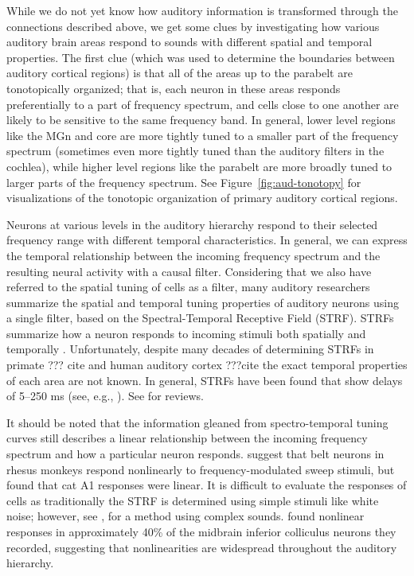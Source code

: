While we do not yet know how auditory information
is transformed through the connections
described above,
we get some clues by investigating
how various auditory brain areas
respond to sounds with different
spatial and temporal properties.
The first clue
(which was used to determine the boundaries
between auditory cortical regions)
is that all of the areas
up to the parabelt are
tonotopically organized;
that is, each neuron in these areas
responds preferentially to
a part of frequency spectrum,
and cells close to one another
are likely to be sensitive
to the same frequency band.
In general, lower level regions
like the MGn and core
are more tightly tuned
to a smaller part of the frequency spectrum
(sometimes even more tightly tuned
than the auditory filters in the cochlea),
while higher level regions
like the parabelt
are more broadly tuned
to larger parts of the frequency spectrum.
See Figure~\ref{fig:aud-tonotopy} for visualizations
of the tonotopic organization
of primary auditory cortical regions.


Neurons at various levels in the auditory hierarchy
respond to their selected frequency range
with different temporal characteristics.
In general, we can express the temporal
relationship between the incoming
frequency spectrum and the resulting
neural activity with a causal filter.
Considering that we also
have referred to the spatial tuning
of cells as a filter,
many auditory researchers
summarize the spatial and temporal
tuning properties of auditory neurons
using a single filter,
based on the
Spectral-Temporal Receptive Field (STRF).
STRFs summarize how a neuron responds
to incoming stimuli both spatially
and temporally \citep{aertsen1981}.
Unfortunately, despite many decades
of determining STRFs in
primate ??? cite and
human auditory cortex ???cite
the exact temporal properties of
each area are not known.
In general, STRFs have been found that
show delays of 5--250 ms
(see, e.g., \citealt[Supplementary material]{mesgarani2014}).
See \citet{kaas1999,kaas2000,scott2003,semple2003}
for reviews.

It should be noted
that the information gleaned from
spectro-temporal tuning curves
still describes a linear relationship
between the incoming frequency spectrum
and how a particular neuron responds.
\citet{tian2004}
suggest that belt neurons
in rhesus monkeys respond nonlinearly
to frequency-modulated sweep stimuli,
but \citet{kowalski1995}
found that cat A1 responses were linear.
It is difficult to evaluate
the responses of cells
as traditionally the STRF
is determined using simple stimuli
like white noise;
however, see \citet{theunissen2000},
for a method using complex sounds.
\citet{escabi2002}
found nonlinear responses
in approximately 40\%
of the midbrain inferior colliculus
neurons they recorded,
suggesting that nonlinearities
are widespread
throughout the auditory hierarchy.

